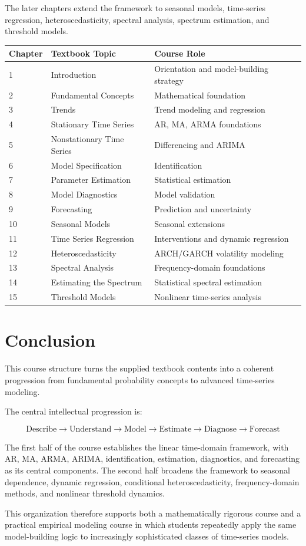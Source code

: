 \documentclass[11pt,a4paper]{article}
\begin{document}
The later chapters extend the framework to seasonal models, time-series
regression, heteroscedasticity, spectral analysis, spectrum estimation, and
threshold models.

\begin{longtable}{p{}p{}p{}}
\toprule
\textbf{Chapter} & \textbf{Textbook Topic} & \textbf{Course Role} \\
\midrule
1 & Introduction & Orientation and model-building strategy \\
2 & Fundamental Concepts & Mathematical foundation \\
3 & Trends & Trend modeling and regression \\
4 & Stationary Time Series & AR, MA, ARMA foundations \\
5 & Nonstationary Time Series & Differencing and ARIMA \\
6 & Model Specification & Identification \\
7 & Parameter Estimation & Statistical estimation \\
8 & Model Diagnostics & Model validation \\
9 & Forecasting & Prediction and uncertainty \\
10 & Seasonal Models & Seasonal extensions \\
11 & Time Series Regression & Interventions and dynamic regression \\
12 & Heteroscedasticity & ARCH/GARCH volatility modeling \\
13 & Spectral Analysis & Frequency-domain foundations \\
14 & Estimating the Spectrum & Statistical spectral estimation \\
15 & Threshold Models & Nonlinear time-series analysis \\
\bottomrule
\end{longtable}

\section{Conclusion}

This course structure turns the supplied textbook contents into a coherent
progression from fundamental probability concepts to advanced time-series
modeling.

The central intellectual progression is:

\[
\boxed{
\text{Describe}
\rightarrow
\text{Understand}
\rightarrow
\text{Model}
\rightarrow
\text{Estimate}
\rightarrow
\text{Diagnose}
\rightarrow
\text{Forecast}
}
\]

The first half of the course establishes the linear time-domain framework,
with AR, MA, ARMA, ARIMA, identification, estimation, diagnostics, and
forecasting as its central components. The second half broadens the framework
to seasonal dependence, dynamic regression, conditional heteroscedasticity,
frequency-domain methods, and nonlinear threshold dynamics.

This organization therefore supports both a mathematically rigorous course
and a practical empirical modeling course in which students repeatedly apply
the same model-building logic to increasingly sophisticated classes of
time-series models.
\end{document}
